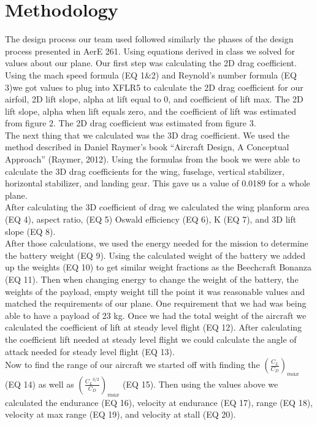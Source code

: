 \documentclass[12pt,A4paper]{article}
\begin{document}
	\clearpage
	\section{Methodology}
	\hspace{.15 in}The design process our team used followed similarly the phases of the design process presented in AerE 261. Using equations derived in class we solved for values about our plane. Our first step was calculating the 2D drag coefficient. Using the mach speed formula (EQ 1\&2) and Reynold’s number formula (EQ 3)we got values to plug into XFLR5 to calculate the 2D drag coefficient for our airfoil, 2D lift slope, alpha at lift equal to 0, and coefficient of lift max. The 2D lift slope, alpha when lift equals zero, and the coefficient of lift was estimated from figure 2. The 2D drag coefficient was estimated from figure 3. \\
	\indent The next thing that we calculated was the 3D drag coefficient. We used the method described in Daniel Raymer’s book “Aircraft Design, A Conceptual Approach” (Raymer, 2012). Using the formulas from the book we were able to calculate the 3D drag coefficients for the wing, fuselage, vertical stabilizer, horizontal stabilizer, and landing gear. This gave us a value of 0.0189 for a whole plane. \\
	\indent After calculating the 3D coefficient of drag we calculated the wing planform area (EQ 4), aspect ratio, (EQ 5) Oswald efficiency (EQ 6), K (EQ 7), and 3D lift slope (EQ 8).\\
	\indent After those calculations, we used the energy needed for the mission to determine the battery weight (EQ 9). Using the calculated weight of the battery we added up the weights (EQ 10) to get similar weight fractions as the Beechcraft Bonanza (EQ 11). Then when changing energy to change the weight of the battery, the weights of the payload, empty weight till the point it was reasonable values and matched the requirements of our plane. One requirement that we had was being able to have a payload of 23 kg. Once we had the total weight of the aircraft we calculated the coefficient of lift at steady level flight (EQ 12). After calculating the coefficient lift needed at steady level flight we could calculate the angle of attack needed for steady level flight (EQ 13). \\
	\indent Now to find the range of our aircraft we started off with finding the $(\frac{C_L}{C_D})_{max}$ (EQ 14) as well as $(\frac{{C_L}^{3/2}}{C_D})_{max}$ (EQ 15). Then using the values above we calculated the endurance (EQ 16), velocity at endurance (EQ 17), range (EQ 18), velocity at max range (EQ 19), and velocity at stall (EQ 20). \\
\end{document}
